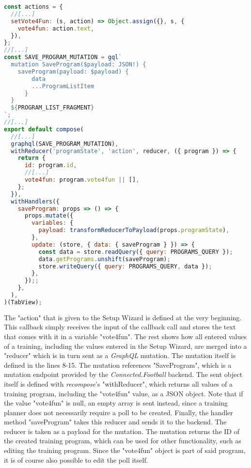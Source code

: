 \begin{lstlisting}[language=javascript,caption=Simplified Training Planner Component with \textit{GraphQL} Mutation,label=lst:trainingPlannerGraphQL]
const actions = {
  //[...]
  setVote4Fun: (s, action) => Object.assign({}, s, {
    vote4fun: action.text,
  }),
};
//[...]
const SAVE_PROGRAM_MUTATION = gql`
  mutation SaveProgram($payload: JSON!) {
    saveProgram(payload: $payload) {
        data
        ...ProgramListItem
      }
  }
  ${PROGRAM_LIST_FRAGMENT}
`;
//[...]
export default compose(
  //[...]
  graphql(SAVE_PROGRAM_MUTATION),
  withReducer('programState', 'action', reducer, ({ program }) => {
    return {
      id: program.id,
      //[...]
      vote4fun: program.vote4fun || [],
    };
  }),
  withHandlers({
    saveProgram: props => () => {
      props.mutate({
        variables: {
          payload: transformReducerToPayload(props.programState),
        },
        update: (store, { data: { saveProgram } }) => {
          const data = store.readQuery({ query: PROGRAMS_QUERY });
          data.getPrograms.unshift(saveProgram);
          store.writeQuery({ query: PROGRAMS_QUERY, data });
        },
      });;
    },
  ),
)(TabView);
\end{lstlisting}

The "action" that is given to the Setup Wizard is defined at the very beginning. This callback simply receives the input of the callback call and stores the text that comes with it in a variable "vote4fun". The rest shows how all entered values of a training, including the values entered in the Setup Wizard, are merged into a "reducer" which is in turn sent as a \textit{GraphQL} mutation.
\newline
The mutation itself is defined in the lines 8-15. The mutation references "SaveProgram", which is a mutation endpoint provided by the \textit{Connected.Football} backend. The sent object itself is defined with \textit{recompose}'s "withReducer", which returns all values of a training program, including the "vote4fun" value, as a JSON object. Note that if the value "vote4fun" is null, an empty array is sent instead, since a training planner does not necessarily require a poll to be created.
\newline
Finally, the handler method "saveProgram" takes this reducer and sends it to the backend. The reducer is taken as a payload for the mutation. The mutation returns the ID of the created training program, which can be used for other functionality, such as editing the training program. Since the "vote4fun" object is part of said program, it is of course also possible to edit the poll itself.

